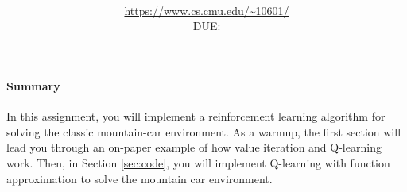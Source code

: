 \documentclass[11pt,addpoints,answers]{exam}
\title{\textsc{\hwName}
} %
\author{\courseName\\
\url{https://www.cs.cmu.edu/~10601/} \\
DUE: \dueDate{} \\ 
}
\date{}
\date{}
\begin{document}
\maketitle


\begin{notebox}
\paragraph{Summary} In this assignment, you will implement a reinforcement learning algorithm for solving the classic mountain-car environment. As a warmup, the first section will lead you through an on-paper example of how value iteration and Q-learning work. Then, in Section \ref{sec:code}, you will implement Q-learning with function approximation to solve the mountain car environment.

\end{notebox}
\end{document}
